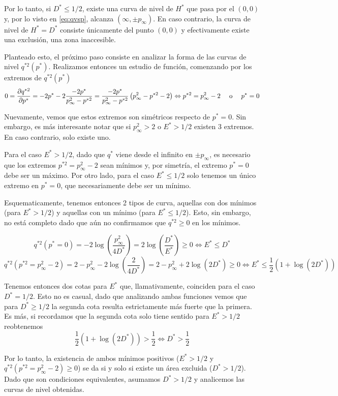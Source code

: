 Por lo tanto, si $D^*\leq 1/2$, existe una curva de nivel de $H^*$ que pasa por el $(0,0)$ y, por lo visto en \ref{eq:qvsp}, alcanza $(\infty, \pm p_\infty)$.
En caso contrario, la curva de nivel de $H^*= D^*$ consiste únicamente del punto $(0,0)$ y efectivamente existe una exclusión, una zona inaccesible.

Planteado esto, el próximo paso consiste en analizar la forma de las curvas de nivel $q^{*2}(p^*)$.
Realizamos entonces un estudio de función, comenzando por los extremos de $q^{*2}(p^*)$
\[ 0 = \frac{\partial q^{*2}}{\partial p^*} = -2p^* - 2\frac{-2p^*}{p_\infty^2-p^{*2}} 
= \frac{-2p^*}{p_\infty^2-p^{*2}} \left( p_\infty^2-p^{*2} - 2 \right) \Leftrightarrow p^{*2} = p_\infty^2 - 2 \quad \text{ o } \quad p^* = 0 \]

Nuevamente, vemos que estos extremos son simétricos respecto de $p^*=0$. 
Sin embargo, es más interesante notar que si $p_\infty^2 > 2$ o $E^* > 1/2$ existen 3 extremos.
En caso contrario, solo existe uno.

Para el caso $E^* > 1/2$, dado que $q^*$ viene desde el infinito en $\pm p_\infty$, es necesario que los extremos $p^{*2} = p_\infty^2 - 2$ sean mínimos y, por simetría, el extremo $p^*=0$ debe ser un máximo. Por otro lado, para el caso $E^*\leq 1/2$ solo tenemos un único extremo en $p^*=0$, que necesariamente debe ser un mínimo. 

Esquematicamente, tenemos entonces 2 tipos de curva, aquellas con dos mínimos (para $E^* > 1/2$) y aquellas con un mínimo (para $E^* \leq 1/2$).
Esto, sin embargo, no está completo dado que aún no confirmamos que $q^{*2}\geq 0$ en los mínimos.

\[ q^{*2}(p^*=0) = -2\log \left( \frac{p_\infty^2}{4D^*} \right) = 2\log \left( \frac{D^*}{E^*} \right) \geq 0 \Leftrightarrow E^*\leq D^* \]
\[ q^{*2}(p^{*2}=p^2_\infty-2) = 2-p_\infty^2 -2\log \left( \frac{2}{4D^*} \right) = 2 - p_\infty^2 + 2\log \left( 2D^* \right) \geq 0 \Leftrightarrow E^*\leq \frac{1}{2}\left( 1 + \log(2D^*) \right)  \]

Tenemos entonces dos cotas para $E^*$ que, llamativamente, coinciden para el caso $D^*=1/2$. 
Esto no es casual, dado que analizando ambas funciones vemos que para $D^*\geq1/2$ la segunda cota resulta estrictamente más fuerte que la primera.
Es más, si recordamos que la segunda cota solo tiene sentido para $E^*>1/2$ reobtenemos
\[ \frac{1}{2} ( 1 + \log(2D^*) ) > \frac{1}{2} \Longleftrightarrow D^* > \frac{1}{2} \]

Por lo tanto, la existencia de ambos mínimos positivos ($E^*>1/2$ y $q^{*2}(p^{*2}=p^2_\infty-2)\geq 0$) se da si y solo si existe un área excluida ($D^*>1/2$).
Dado que son condiciones equivalentes, asumamos $D^*>1/2$ y analicemos las curvas de nivel obtenidas.

